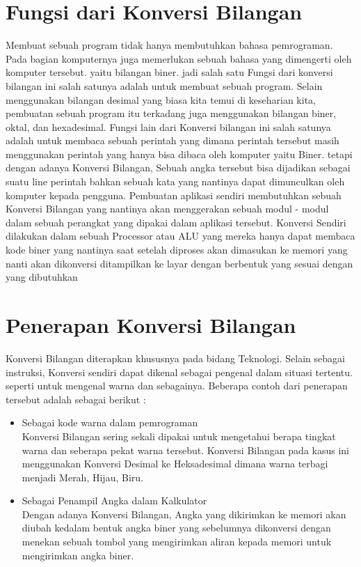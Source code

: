 {\section{Fungsi dari Konversi Bilangan} %
Membuat sebuah program tidak hanya membutuhkan bahasa pemrograman. Pada bagian komputernya juga memerlukan sebuah bahasa yang dimengerti oleh komputer tersebut. yaitu bilangan biner. jadi salah satu Fungsi dari konversi bilangan ini salah satunya adalah untuk membuat sebuah program. Selain menggunakan bilangan desimal yang biasa kita temui di keseharian kita, pembuatan sebuah program itu terkadang juga menggunakan bilangan biner, oktal, dan hexadesimal.
Fungsi lain dari Konversi bilangan ini salah satunya adalah untuk membaca sebuah perintah yang dimana perintah tersebut masih menggunakan perintah yang hanya bisa dibaca oleh komputer yaitu Biner. tetapi dengan adanya Konversi Bilangan, Sebuah angka tersebut bisa dijadikan sebagai suatu line perintah bahkan sebuah kata yang nantinya dapat dimunculkan oleh komputer kepada pengguna. Pembuatan aplikasi sendiri membutuhkan sebuah Konversi Bilangan yang nantinya akan menggerakan sebuah modul - modul dalam sebuah perangkat yang dipakai dalam aplikasi tersebut. 
Konversi Sendiri dilakukan dalam sebuah Processor atau ALU yang mereka hanya dapat membaca kode biner yang nantinya saat setelah diproses akan dimasukan ke memori yang nanti akan dikonversi ditampilkan ke layar dengan berbentuk yang sesuai dengan yang dibutuhkan

\section{Penerapan Konversi Bilangan} %
Konversi Bilangan diterapkan khususnya pada bidang Teknologi. Selain sebagai instruksi, Konversi sendiri dapat dikenal sebagai pengenal dalam situasi tertentu. seperti untuk mengenal warna dan sebagainya. Beberapa contoh dari penerapan tersebut adalah sebagai berikut : 
\begin{itemize}
	\item Sebagai kode warna dalam pemrograman \\ Konversi Bilangan sering sekali dipakai untuk mengetahui berapa tingkat warna dan seberapa pekat warna tersebut. Konversi Bilangan pada kasus ini menggunakan Konversi Desimal ke Heksadesimal dimana warna terbagi menjadi Merah, Hijau, Biru. 
	\item Sebagai Penampil Angka dalam Kalkulator \\ Dengan adanya Konversi Bilangan, Angka yang dikirimkan ke memori akan diubah kedalam bentuk angka biner yang sebelumnya dikonversi dengan menekan sebuah tombol yang mengirimkan aliran kepada memori untuk mengirimkan angka biner.	
\end{itemize}

}

